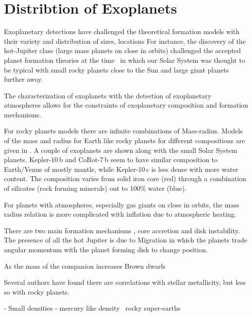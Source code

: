 
\section{Distribtion of Exoplanets}

Exoplanetary detections have challenged the theoretical formation models with their variety and distribution of sizes, locations For instance, the discovery of the hot-Jupiter class (large mass planets on close in orbits) challenged the accepted planet formation theories at the time~\citep[.e.g][]{pollack_formation_1996} in which our Solar System was thought to be typical with small rocky planets close to the Sun and large giant planets further away.

The characterization of exoplanets with the detection of exoplanetary atmospheres allows for the constraints of exoplanetary composition and formation mechanisms.

For rocky planets models there are infinite combinations of Mass-radius. 
Models of the mass and radius for Earth like rocky planets for different compositions are given in . A couple of exoplanets are shown along with the small Solar System planets. {Kepler-10\,b} and {CoRot-7\,b} seem to have similar composition to Earth/Venus of mostly mantle, while {Kepler-10\,c} is less dense with more water content. The composition varies from solid iron core (red) through a combination of silicates (rock forming minerals) out to 100\% water (blue).


For planets with atmospheres, especially gas giants on close in orbits, the mass radius relation is more complicated with inflation due to atmospheric heating.



There are two main formation mechanisms , core accretion and disk instability.
The presence of all the hot Jupiter is due to Migration in which the planets trade angular momentum with the planet forming disk to change position.

As the mass of the companion increases
Brown dwarfs

Several authors have found there are correlations with stellar metallicity, but less so with rocky planets.


- Small densities - mercury like  density~\citet{dittmann_temperate_2017, santerne_earthsized_2018, ment_second_2018} rocky super-earths\\



